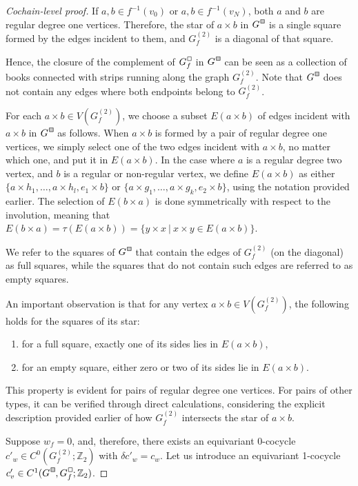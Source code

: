 \documentclass[a4paper,12pt,reqno,oneside]{amsart}
\theoremstyle{plain}
\theoremstyle{definition}
\theoremstyle{plain}
\newcommand{\Z}{\mathbb{Z}}
\newcommand{\gbox}{\tikz{\node[shape=rectangle,fill=black!20,draw,inner sep=0.7mm,align=center] (char) {};}}
\newcommand{\wbox}{\tikz{\node[shape=rectangle,draw,inner sep=0.7mm,align=center] (char) {};}}
\newcommand*\Gc{G^{\hspace{1pt}\raisebox{0.8pt}{\gbox}}}
\newcommand*\Gcf{G^{\hspace{1pt}\raisebox{0.8pt}{\wbox}}_{f}}
\begin{document}
\begin{proof}[Cochain-level proof]
  If $a, b \in f^{-1}(v_0)$ or $a, b \in f^{-1}(v_N)$, both $a$ and $b$ are regular degree one
  vertices. Therefore, the star of $a \times b$ in $\Gc$ is a single square formed by
  the edges incident to them, and $G^{(2)}_f$ is a diagonal of that square.

  Hence, the closure of the complement of $\Gcf$ in $\Gc$ can be seen as a collection of books
  connected with strips running along the graph $G^{(2)}_f$. Note that $\Gc$ does not contain any
  edges where both endpoints belong to $G^{(2)}_f$.

  For each $a \times b \in V(G^{(2)}_f)$, we choose a subset $E(a \times b)$ of edges incident with
  $a \times b$ in $\Gc$ as follows. When $a \times b$ is formed by a pair of regular degree one
  vertices, we simply select one of the two edges incident with $a \times b$, no matter which one,
  and put it in $E(a \times b)$. In the case where $a$ is a regular degree two vertex, and $b$ is a
  regular or non-regular vertex, we define $E(a \times b)$ as either
  $\{a \times h_1, \dots, a \times h_l, e_1 \times b \}$ or
  $\{a \times g_1, \dots, a \times g_k, e_2 \times b \}$, using the notation provided earlier. The
  selection of $E(b \times a)$ is done symmetrically with respect to the involution, meaning that
  $E(b \times a) = \tau(E(a \times b)) = \{ y \times x\ |\ x \times y \in E(a \times b) \}$.

  We refer to the squares of $\Gc$ that contain the edges of $G^{(2)}_f$ (on the diagonal) as
  full squares, while the squares that do not contain such edges are referred to as empty
  squares.

  An important observation is that for any vertex $a \times b \in V(G^{(2)}_f)$, the following holds
  for the squares of its star:
  \begin{enumerate}
  \item for a full square, exactly one of its sides lies in $E(a \times b)$,
  \item for an empty square, either zero or two of its sides lie in $E(a \times b)$.
  \end{enumerate}
  This property is evident for pairs of regular degree one vertices. For pairs of other types, it
  can be verified through direct calculations, considering the explicit description provided earlier
  of how $G^{(2)}_f$ intersects the star of $a \times b$.

  Suppose $w_f = 0$, and, therefore, there exists an equivariant 0-cocycle
  $c'_w \in C^0(G^{(2)}_f; \Z_2)$ with $\delta c'_w = c_w$. Let us introduce an equivariant
  1-cocycle $c'_v \in C^1(\Gc, \Gcf; \Z_2)$.


\end{proof}
\end{document}
